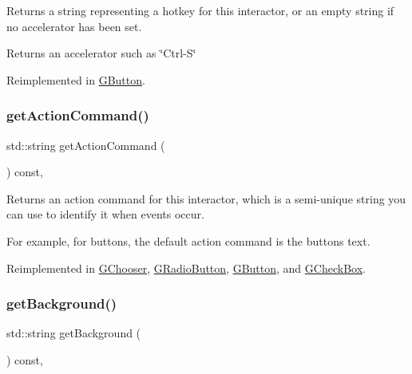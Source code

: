 Returns a string representing a hotkey for this interactor, or an empty string if no accelerator has been set. 

\begin{DoxyReturn}{Returns}
an accelerator such as \char`\"{}\+Ctrl-\/\+S\char`\"{} 
\end{DoxyReturn}


Reimplemented in \mbox{\hyperlink{classGButton_a57806dc9defb73f76f493f8548319924}{G\+Button}}.

\mbox{\label{classGInteractor_a94eb4276000c4fdfb508ce9e6317a82a}} 
\subsubsection{\texorpdfstring{get\+Action\+Command()}{getActionCommand()}}
{\footnotesize\ttfamily std\+::string get\+Action\+Command (\begin{DoxyParamCaption}{ }\end{DoxyParamCaption}) const\hspace{0.3cm}{\ttfamily [virtual]}, {\ttfamily [inherited]}}



Returns an action command for this interactor, which is a semi-\/unique string you can use to identify it when events occur. 

For example, for buttons, the default action command is the button\textquotesingle{}s text. 

Reimplemented in \mbox{\hyperlink{classGChooser_a4f83505141da1f8446f0e0e0a9507930}{G\+Chooser}}, \mbox{\hyperlink{classGRadioButton_a4f83505141da1f8446f0e0e0a9507930}{G\+Radio\+Button}}, \mbox{\hyperlink{classGButton_a4f83505141da1f8446f0e0e0a9507930}{G\+Button}}, and \mbox{\hyperlink{classGCheckBox_a4f83505141da1f8446f0e0e0a9507930}{G\+Check\+Box}}.

\mbox{\label{classGInteractor_a808e22cc1fdfbecf71ed8c64ef4600e0}} 
\subsubsection{\texorpdfstring{get\+Background()}{getBackground()}}
{\footnotesize\ttfamily std\+::string get\+Background (\begin{DoxyParamCaption}{ }\end{DoxyParamCaption}) const\hspace{0.3cm}{\ttfamily [virtual]}, {\ttfamily [inherited]}}



